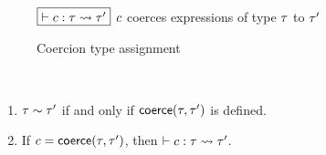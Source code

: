\documentclass[index.tex]{subfiles}
\begin{document}
\begin{figure}[htb!]
  $\judgbox{\ctxCoercesType{}{\CMV}{\TMV}{\TMV'}}$ $\CMV$ coerces expressions of type $\TMV$ to $\TMV'$

  \begin{mathpar}








  \end{mathpar}
  \caption{Coercion type assignment}
  \label{fig:coercion-types}
\end{figure}

\begin{lemmat}[name=Well-typed coercions] \
  \begin{enumerate}
    \item $\isConsistent{\TMV}{\TMV'}$ if and only if $\coerce(\TMV, \TMV')$ is defined.
    \item If $\CMV = \coerce(\TMV, \TMV')$, then $\ctxCoercesType{}{\CMV}{\TMV}{\TMV'}$.
  \end{enumerate}
\end{lemmat}
\end{document}
